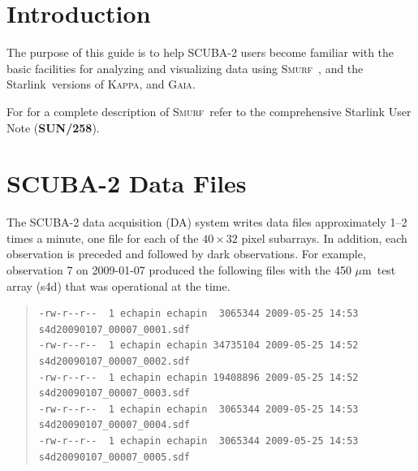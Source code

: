 \documentclass[twoside,11pt]{article}
\newcommand{\micron}{\mbox{\,${\mu}$m}}            %
\newcommand{\stardocinitials}  {SC}
\newcommand{\stardocnumber}    {19.01}
\newcommand{\stardocabstract}  {[Text of abstract]}
\newenvironment{myquote}{\begin{quote}\begin{small}}{\end{small}\end{quote}}
\newcommand{\starlink}{\htmladdnormallink{Starlink}{http://star-www.rl.ac.uk/}}
\newcommand{\Kappa}{\xref{\textsc{Kappa}}{sun95}{}}
\newcommand{\gaia}{\xref{\textsc{Gaia}}{sun214}{}}
\newcommand{\smurf}{\xref{\textsc{Smurf}}{sun258}{}}
\newcommand{\stardocname}{\stardocinitials /\stardocnumber}
\newcommand{\htmladdnormallink}[2]{#1}
\newenvironment{latexonly}{}{}
\newcommand{\xref}[3]{#1}
\newcommand{\xlabel}[1]{}
\renewcommand{\_}{\texttt{\symbol{95}}}
\renewcommand{\thepage}{\roman{page}}
\begin{document}




  \newpage
  \begin{latexonly}
    \setlength{\parskip}{0mm}
    \tableofcontents
    \setlength{\parskip}{\medskipamount}
    \markboth{\stardocname}{\stardocname}
  \end{latexonly}


\cleardoublepage
\renewcommand{\thepage}{\arabic{page}}
\setcounter{page}{1}


\section{\xlabel{introduction}Introduction}

The purpose of this guide is to help SCUBA-2 users become familiar
with the basic facilities for analyzing and visualizing data using
\smurf\ \cite{smurf}, and the \starlink\ versions of \Kappa \cite{kappa},
and \gaia \cite{gaia}.

For for a complete description of \smurf\ refer to the comprehensive
Starlink User Note (\xref{\textbf{SUN/258}}{sun258}{}).


\section{\xlabel{data_files}SCUBA-2 Data Files}

The SCUBA-2 data acquisition (DA) system writes data files
approximately 1--2 times a minute, one file for each of the
$40\times32$ pixel subarrays. In addition, each observation is
preceded and followed by dark observations. For example, observation 7
on 2009-01-07 produced the following files with the 450\,\micron\ test
array (s4d) that was operational at the time.

\begin{myquote}
\begin{verbatim}
-rw-r--r--  1 echapin echapin  3065344 2009-05-25 14:53 s4d20090107_00007_0001.sdf
-rw-r--r--  1 echapin echapin 34735104 2009-05-25 14:52 s4d20090107_00007_0002.sdf
-rw-r--r--  1 echapin echapin 19408896 2009-05-25 14:52 s4d20090107_00007_0003.sdf
-rw-r--r--  1 echapin echapin  3065344 2009-05-25 14:53 s4d20090107_00007_0004.sdf
-rw-r--r--  1 echapin echapin  3065344 2009-05-25 14:53 s4d20090107_00007_0005.sdf
\end{verbatim}
\end{myquote}
\end{document}
